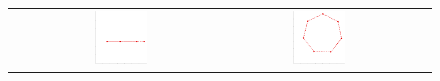 \documentclass[11pt,a4paper]{book}
\newcommand{\wToy}{0.288}
\newcommand{\raiseToy}{+2.1cm}
\begin{document}
\begin{figure}[h!]
  \centering
  \begin{tabular}{rccc}

    \raisebox{\raiseToy}{(1)} &
    \includegraphics[width=\wToy\textwidth]{img-sgd/toy.9.a} &
    \includegraphics[width=\wToy\textwidth]{img-sgd/toy.9.m} &

\end{tabular}
\end{figure}
\end{document}
